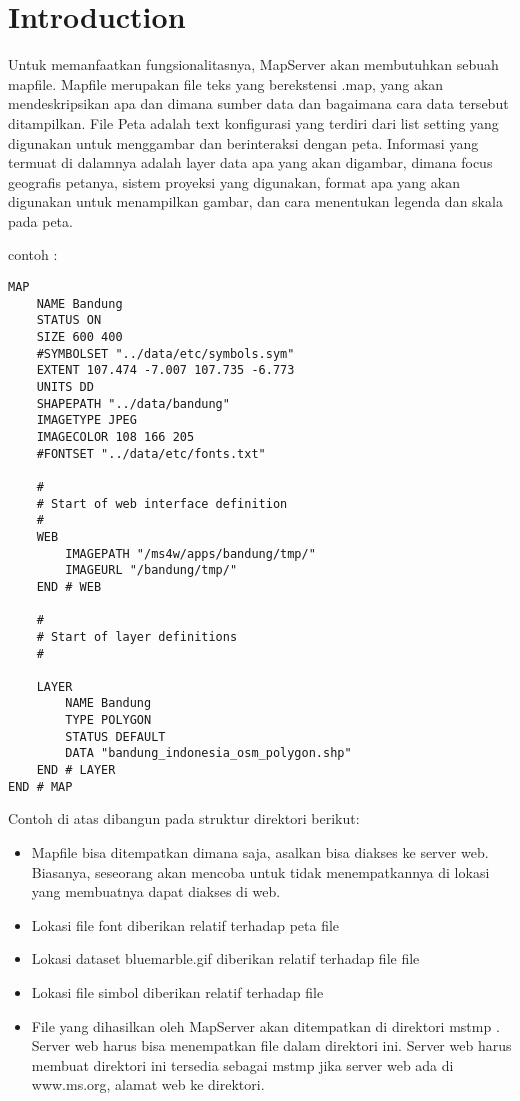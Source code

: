 

\section{Introduction}

Untuk memanfaatkan fungsionalitasnya, MapServer akan membutuhkan sebuah mapfile. Mapfile merupakan file teks yang berekstensi .map,
yang akan mendeskripsikan apa dan dimana sumber data dan bagaimana cara data tersebut ditampilkan. 
File Peta adalah text konfigurasi yang terdiri dari list setting yang digunakan untuk menggambar dan berinteraksi dengan peta. 
Informasi yang termuat di dalamnya adalah layer data apa yang akan digambar, dimana focus geografis petanya, 
sistem proyeksi yang digunakan, format apa yang akan digunakan untuk menampilkan gambar, dan cara menentukan legenda dan skala pada peta.

contoh :
\begin{verbatim}
MAP
    NAME Bandung
    STATUS ON
    SIZE 600 400
    #SYMBOLSET "../data/etc/symbols.sym"
    EXTENT 107.474 -7.007 107.735 -6.773
    UNITS DD
    SHAPEPATH "../data/bandung"
	IMAGETYPE JPEG
    IMAGECOLOR 108 166 205
    #FONTSET "../data/etc/fonts.txt"

    #
    # Start of web interface definition
    #
    WEB
		IMAGEPATH "/ms4w/apps/bandung/tmp/" 
		IMAGEURL "/bandung/tmp/"
    END # WEB

    #
    # Start of layer definitions
    #
	
    LAYER
        NAME Bandung
        TYPE POLYGON
        STATUS DEFAULT
        DATA "bandung_indonesia_osm_polygon.shp"
    END # LAYER
END # MAP
\end{verbatim}

Contoh di atas dibangun pada struktur direktori berikut:

\begin{itemize}

\item Mapfile bisa ditempatkan dimana saja, asalkan bisa diakses ke server web. Biasanya, seseorang akan mencoba untuk tidak menempatkannya di lokasi yang membuatnya dapat diakses di web.
\item Lokasi file font diberikan relatif terhadap peta file
\item Lokasi dataset  bluemarble.gif  diberikan relatif terhadap file file
\item Lokasi file simbol diberikan relatif terhadap file
\item File yang dihasilkan oleh MapServer akan ditempatkan di direktori mstmp . Server web harus bisa menempatkan file dalam direktori ini. Server web harus membuat direktori ini tersedia sebagai mstmp  jika server web ada di www.ms.org, alamat web ke direktori.
\end{itemize}

